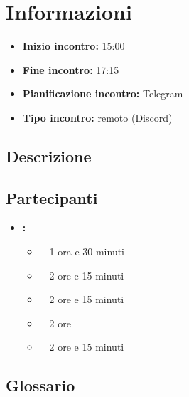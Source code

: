 \section{Informazioni}
\begin{itemize}
	\item \textbf{Inizio incontro:} 15:00
	\item \textbf{Fine incontro:} 17:15
	\item \textbf{Pianificazione incontro:} Telegram
	\item \textbf{Tipo incontro:} remoto (Discord)
\end{itemize}

\subsection{Descrizione}
\DocDescription

\subsection{Partecipanti}

\begin{itemize}
	\item \textbf{\GroupName:}
	\begin{itemize}
		\item \tommaso \ \rightarrow\ 1 ora e 30 minuti
		\item \marco \ \rightarrow\ 2 ore e 15 minuti
		\item \riccardo \ \rightarrow\ 2 ore e 15 minuti
		\item \mattia \ \rightarrow\ 2 ore
		\item \raul \ \rightarrow\ 2 ore e 15 minuti
	\end{itemize}
\end{itemize}

\subsection{Glossario}
\GlossarioIntroduzione

\clearpage